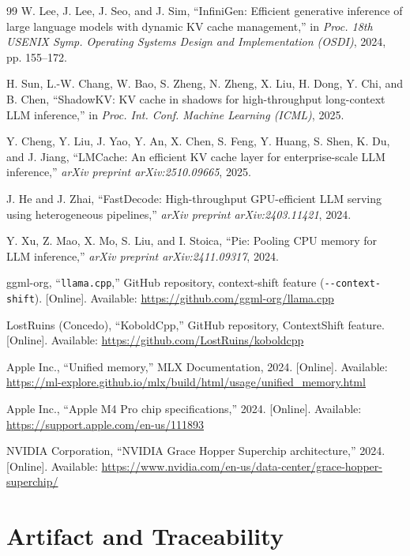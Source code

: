\documentclass[manuscript,anonymous,review]{acmart}
\begin{document}
\begin{thebibliography}{99}
W. Lee, J. Lee, J. Seo, and J. Sim, ``InfiniGen: Efficient generative inference
of large language models with dynamic KV cache management,'' in \emph{Proc.
18th USENIX Symp. Operating Systems Design and Implementation (OSDI)}, 2024,
pp. 155--172.

H. Sun, L.-W. Chang, W. Bao, S. Zheng, N. Zheng, X. Liu, H. Dong, Y. Chi, and
B. Chen, ``ShadowKV: KV cache in shadows for high-throughput long-context LLM
inference,'' in \emph{Proc. Int. Conf. Machine Learning (ICML)}, 2025.

Y. Cheng, Y. Liu, J. Yao, Y. An, X. Chen, S. Feng, Y. Huang, S. Shen, K. Du,
and J. Jiang, ``LMCache: An efficient KV cache layer for enterprise-scale LLM
inference,'' \emph{arXiv preprint arXiv:2510.09665}, 2025.

J. He and J. Zhai, ``FastDecode: High-throughput GPU-efficient LLM serving
using heterogeneous pipelines,'' \emph{arXiv preprint arXiv:2403.11421},
2024.

Y. Xu, Z. Mao, X. Mo, S. Liu, and I. Stoica, ``Pie: Pooling CPU memory
for LLM inference,'' \emph{arXiv preprint arXiv:2411.09317}, 2024.

ggml-org, ``\texttt{llama.cpp},'' GitHub repository, context-shift feature
(\texttt{-{}-context-shift}). [Online]. Available:
\url{https://github.com/ggml-org/llama.cpp}

LostRuins (Concedo), ``KoboldCpp,'' GitHub repository, ContextShift
feature. [Online]. Available:
\url{https://github.com/LostRuins/koboldcpp}

Apple Inc., ``Unified memory,'' MLX Documentation, 2024. [Online]. Available:
\url{https://ml-explore.github.io/mlx/build/html/usage/unified_memory.html}

Apple Inc., ``Apple M4 Pro chip specifications,'' 2024. [Online]. Available:
\url{https://support.apple.com/en-us/111893}

NVIDIA Corporation, ``NVIDIA Grace Hopper Superchip architecture,'' 2024.
[Online]. Available:
\url{https://www.nvidia.com/en-us/data-center/grace-hopper-superchip/}

\end{thebibliography}

\appendix
\section{Artifact and Traceability}
\label{sec:artifact}
\end{document}
